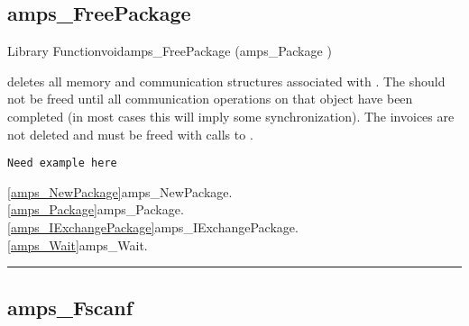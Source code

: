 \subsection{amps\_FreePackage}
\label{amps_FreePackage}


\begin{deftypefn}{Library Function}{void}{amps\_FreePackage}
(amps_Package )

\DESCRIPTION

 deletes all memory and communication structures
associated with .  The  should not be freed
until all communication operations on that object have been completed
(in most cases this will imply some synchronization).  The invoices are
not deleted and must be freed with calls to . 

\begin{display}\begin{verbatim}
Need example here
\end{verbatim}\end{display}

\SEEALSO
\vref{amps_NewPackage}{amps\_NewPackage}. \\
\vref{amps_Package}{amps\_Package}. \\
\vref{amps_IExchangePackage}{amps\_IExchangePackage}. \\
\vref{amps_Wait}{amps\_Wait}. \\

\end{deftypefn}



\noindent\rule{\textwidth}{1mm}

\subsection{amps\_Fscanf}
\label{amps_Fscanf}



